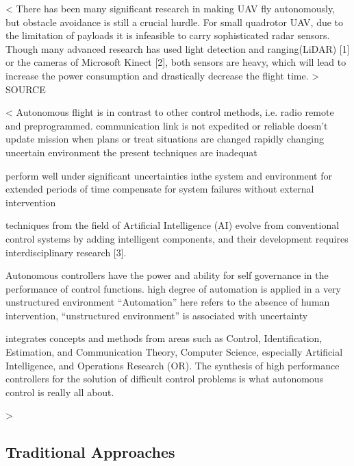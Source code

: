 <
There  has  been  many  significant  research  in  making  UAV  fly  autonomously,  but  obstacle  avoidance  is  still  a  crucial   hurdle.   For   small   quadrotor   UAV,   due   to   the   limitation  of  payloads  it  is  infeasible  to  carry  sophisticated  radar  sensors.  Though  many  advanced  research  has  used  light  detection  and  ranging(LiDAR)  [1]  or  the  cameras  of  Microsoft Kinect [2], both sensors are heavy, which will lead to  increase  the  power  consumption  and  drastically  decrease  the flight time.
>
SOURCE 

<
Autonomous flight is in contrast to other
control methods, i.e. radio remote and preprogrammed.
    communication  link  is  not  expedited  or  reliable
    doesn’t  update  mission  when  plans  or  treat  situations  are  changed
    rapidly  changing  uncertain  environment the present techniques are inadequat

perform  well  under  significant  uncertainties  inthe  system  and  environment for extended periods of time
compensate  for  system  failures  without  external  intervention

techniques  from  the  field  of  Artificial  Intelligence  (AI)  
    evolve  from  conventional  control  systems  by  adding  intelligent  components,  and  their  development requires interdisciplinary research [3]. 

Autonomous  controllers  have  the  power  and  ability  for  self  governance  in  the  performance  of  control  functions.
high  degree   of   automation   is   applied   in   a   very   unstructured   environment
“Automation”  here  refers  to  the  absence  of  human   intervention,
“unstructured   environment”   is   associated with uncertainty

integrates concepts and methods from areas such as Control, Identification,   Estimation,   and   Communication   Theory,   Computer   Science,   especially   Artificial   Intelligence,   and   Operations  Research  (OR).  
The   synthesis   of   high   performance   controllers  for  the  solution  of  difficult  control  problems  is  what autonomous control is really all about.  

>

\subsection{Traditional Approaches}

